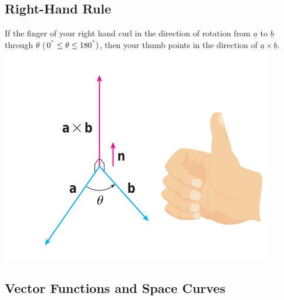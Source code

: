 \documentclass[12 pt]{article}
\theoremstyle{definition}
\begin{document}
\subsection{Right-Hand Rule} If the finger of your right hand curl in the direction of rotation from $\underline{a}$ to $\underline{b}$ through $\theta$ ($0^{\degree}\leq \theta \leq 180^{\degree})$, then your thumb points in the direction of $\underline{a} \times \underline{b}$.
\includegraphics[scale=0.4]{rhr}
\subsection{Vector Functions and Space Curves}
\end{document}
